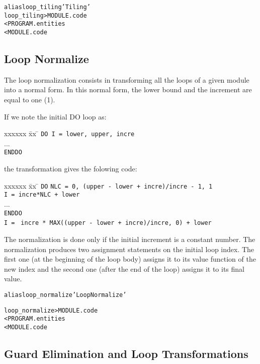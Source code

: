 \documentclass[a4paper]{report}
\newenvironment{PipsMake}{\begin{alltt}}{\end{alltt}}
\begin{document}
\begin{PipsMake}
alias loop_tiling 'Tiling'
loop_tiling                            > MODULE.code
        < PROGRAM.entities
        < MODULE.code
\end{PipsMake}

\subsection{Loop Normalize}
\label{subsection-loop-normalize}

The loop normalization consists in transforming all the loops of a given
module into a normal form. In this normal form, the lower bound and the
increment are equal to one (1).

If we note the initial DO loop as:
\begin{tabbing}
xxxxxx \= xx \= \kill
\> {\tt DO I = lower, upper, incre}  \> \\
\> \> ... \\
\> {\tt ENDDO} \>
\end{tabbing}
the transformation gives the folowing code:
\begin{tabbing}
xxxxxx \= xx \= \kill
\> {\tt DO} \> {\tt NLC = 0, (upper - lower + incre)/incre - 1, 1} \\
\> \> {\tt I = incre*NLC + lower} \\
\> \> ... \\
\> {\tt ENDDO} \> \\
\> {\tt I =} \> {\tt ~incre * MAX((upper - lower + incre)/incre, 0) + lower}
\end{tabbing}

The normalization is done only if the initial increment is a constant
number. The normalization produces two assignment statements on the
initial loop index. The first one (at the beginning of the loop body)
assigns it to its value function of the new index and the second one
(after the end of the loop) assigns it to its final value.

\begin{PipsMake}
alias loop_normalize 'Loop Normalize'
\end{PipsMake}

\begin{PipsMake}
loop_normalize          > MODULE.code
        < PROGRAM.entities
        < MODULE.code
\end{PipsMake}


\subsection{Guard Elimination and Loop Transformations}
\label{subsection-guard-elimination}
\end{document}
